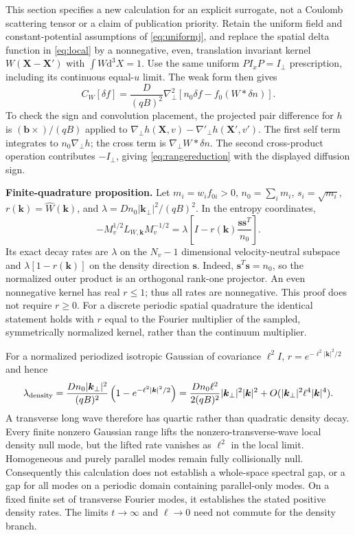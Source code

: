 \documentclass[11pt,letterpaper]{article}
\newcommand{\dd}{\mathrm d}
\newcommand{\X}{\mathbf X}
\begin{document}
This section specifies a new calculation for an explicit surrogate, not a
Coulomb scattering tensor or a claim of publication priority. Retain the uniform
field and constant-potential assumptions of \eqref{eq:uniformj}, and replace the
spatial delta function in \eqref{eq:local} by a nonnegative, even, translation
invariant kernel $W(\X-\X')$ with $\int W\dd^3X=1$. Use the same uniform
$P I_xP=I_\perp$ prescription, including its continuous equal-$u$ limit.
The weak form then gives
\begin{equation}
 C_W[\delta f]=\frac{D}{(qB)^2}\nabla_\perp^2
 \left[n_0\delta f-f_0(W*\delta n)\right].
 \label{eq:rangereduction}
\end{equation}
To check the sign and convolution placement, the projected pair difference for
$h$ is $(\bm b\times)/(qB)$ applied to
$\nabla_\perp h(\X,v)-\nabla'_{\perp}h(\X',v')$. The first self term integrates
to $n_0\nabla_\perp h$; the cross term is $\nabla_\perp W*\delta n$.
The second cross-product operation contributes $-I_\perp$, giving
\eqref{eq:rangereduction} with the displayed diffusion sign.

\textbf{Finite-quadrature proposition.} Let $m_i=w_i f_{0i}>0$, $n_0=\sum_i m_i$,
$s_i=\sqrt{m_i}$, $r(\bm k)=\widehat W(\bm k)$, and
$\lambda=Dn_0|\bm k_\perp|^2/(qB)^2$. In the entropy coordinates,
\begin{equation}
 -M_v^{1/2}L_{W,\bm k}M_v^{-1/2}
 =\lambda\left[I-r(\bm k)\frac{\bm s\bm s^T}{n_0}\right].
 \label{eq:rangespectrum}
\end{equation}
Its exact decay rates are $\lambda$ on the $N_v-1$ dimensional velocity-neutral
subspace and $\lambda[1-r(\bm k)]$ on the density direction $\bm s$.
Indeed, $\bm s^T\bm s=n_0$, so the normalized outer product is an orthogonal
rank-one projector. An even nonnegative kernel has real $r\le1$; thus all
rates are nonnegative. This proof does not require $r\ge0$.
For a discrete periodic spatial quadrature the identical statement holds with
$r$ equal to the Fourier multiplier of the sampled, symmetrically normalized
kernel, rather than the continuum multiplier.

For a normalized periodized isotropic Gaussian of covariance $\ell^2 I$,
$r=e^{-\ell^2|\bm k|^2/2}$ and hence
\begin{equation}
 \lambda_{\rm density}
 =\frac{Dn_0|\bm k_\perp|^2}{(qB)^2}
   \left(1-e^{-\ell^2|\bm k|^2/2}\right)
 =\frac{Dn_0\ell^2}{2(qB)^2}|\bm k_\perp|^2|\bm k|^2
  +O(|\bm k_\perp|^2\ell^4|\bm k|^4).
 \label{eq:quartic}
\end{equation}
A transverse long wave therefore has quartic rather than quadratic density
decay. Every finite nonzero Gaussian range lifts the nonzero-transverse-wave
local density null mode, but the lifted rate vanishes as $\ell^2$ in the local
limit. Homogeneous and purely parallel modes remain fully collisionally null.
Consequently this calculation does not establish a whole-space spectral gap,
or a gap for all modes on a periodic domain containing parallel-only modes.
On a fixed finite set of transverse Fourier modes, it establishes the stated
positive density rates. The limits $t\to\infty$ and $\ell\to0$ need not commute
for the density branch.
\end{document}
